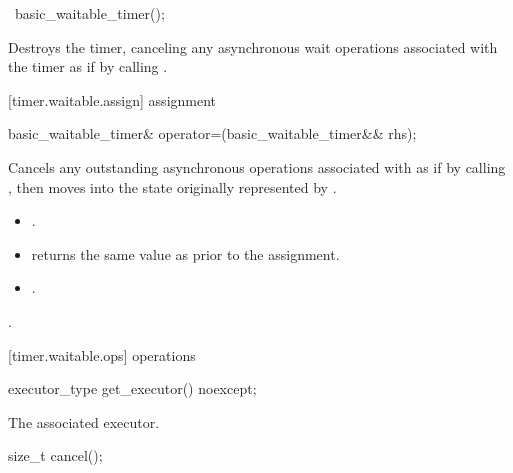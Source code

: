 %
\begin{itemdecl}
~basic_waitable_timer();
\end{itemdecl}

\begin{itemdescr}
\pnum
\effects Destroys the timer, canceling any asynchronous wait operations associated with the timer as if by calling .
\end{itemdescr}



[timer.waitable.assign]{ assignment}

%
\begin{itemdecl}
basic_waitable_timer& operator=(basic_waitable_timer&& rhs);
\end{itemdecl}

\begin{itemdescr}
\pnum
\effects Cancels any outstanding asynchronous operations associated with  as if by calling , then moves into  the state originally represented by .

\pnum
\postconditions
\begin{itemize}
\item
{}.
\item
{} returns the same value as  prior to the assignment.
\item
{}.
\end{itemize}

\pnum
\returns {}.
\end{itemdescr}



[timer.waitable.ops]{ operations}

%
\begin{itemdecl}
executor_type get_executor() noexcept;
\end{itemdecl}

\begin{itemdescr}
\pnum
\returns The associated executor.
\end{itemdescr}

%
\begin{itemdecl}
size_t cancel();
\end{itemdecl}

